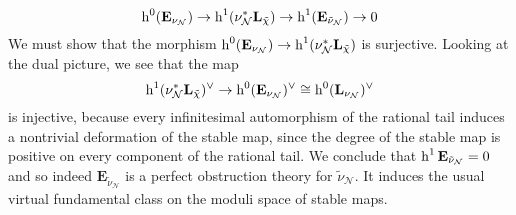 \begin{equation*} \operatorname{h}^{0}(\mathbf E_{\nu_\mathcal{N}}) \rightarrow \operatorname{h}^{1}(\nu_\mathcal{N}^*\mathbf L_{\tilde{\chi}}) \rightarrow \operatorname{h}^{1} (\mathbf E_{\tilde{\nu}_{\mathcal{N}}}) \rightarrow 0 \end{equation*}
We must show that the morphism $\operatorname{h}^0 (\mathbf{E}_{\nu_{\mathcal{N}}}) \rightarrow \operatorname{h}^1(\nu_{\mathcal{N}}^* \mathbf{L}_{\tilde{\chi}})$ is surjective. Looking at the dual picture, we see that the map
\begin{equation*} \operatorname{h}^{1}(\nu_\mathcal{N}^*\mathbf{L}_{\tilde{\chi}})^\vee \rightarrow \operatorname{h}^{0}(\mathbf E_{\nu_\mathcal{N}})^\vee \cong \operatorname{h}^{0}(\mathbf{L}_{\nu_\mathcal{N}})^\vee \end{equation*}
is injective, because every infinitesimal automorphism of the rational tail induces a nontrivial deformation of the stable map, since the degree of the stable map is positive on every component of the rational tail. We conclude that $\operatorname{h}^{1}\mathbf E_{\tilde{\nu}_{\mathcal{N}}}=0$ and so indeed $\mathbf{E}_{\tilde{\nu}_{\mathcal{N}}}$ is a perfect obstruction theory for $\tilde{\nu}_{\mathcal{N}}$. It induces the usual virtual fundamental class on the moduli space of stable maps.


